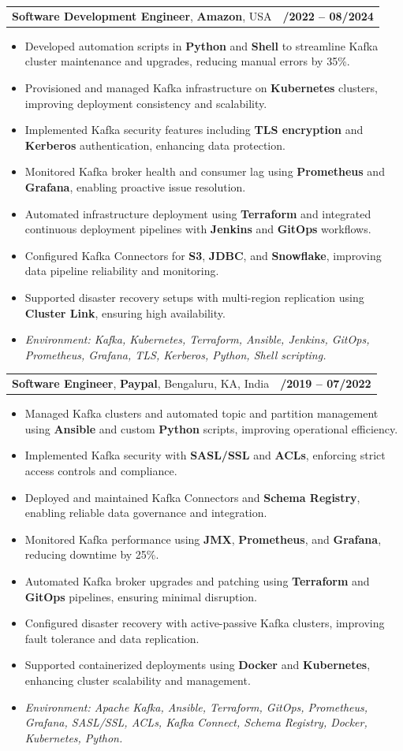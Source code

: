 \documentclass[letterpaper,11pt]{article}
\makeatletter
\newcommand{\resumeItem}[1]{
  \item\footnotesize{
    {#1 \vspace{-2pt}}
  }
}
\newcommand{\resumeSubheading}[4]{
  \vspace{-2pt}\item
    \begin{tabular*}{1.0\textwidth}[t]{l@{\extracolsep{\fill}}r}
      \textbf{\fontsize{10pt}{14pt}\selectfont #3}, \textbf{\fontsize{10pt}{14pt}\selectfont #1}, \fontsize{10pt}{14pt}\selectfont #4 & \textbf{\fontsize{10pt}{14pt}\selectfont #2} \\
    \end{tabular*}\vspace{-7pt}
}
\newcommand{\resumeItemListStart}{\begin{itemize}[leftmargin=*]}
\newcommand{\resumeItemListEnd}{\end{itemize}\vspace{-5pt}}
\makeatother
\begin{document}
\resumeSubheading
{Amazon}{10/2022 -- 08/2024}
{Software Development Engineer}{USA}
\resumeItemListStart
  \resumeItem{Developed automation scripts in \textbf{Python} and \textbf{Shell} to streamline Kafka cluster maintenance and upgrades, reducing manual errors by 35\%.}
  \resumeItem{Provisioned and managed Kafka infrastructure on \textbf{Kubernetes} clusters, improving deployment consistency and scalability.}
  \resumeItem{Implemented Kafka security features including \textbf{TLS encryption} and \textbf{Kerberos} authentication, enhancing data protection.}
  \resumeItem{Monitored Kafka broker health and consumer lag using \textbf{Prometheus} and \textbf{Grafana}, enabling proactive issue resolution.}
  \resumeItem{Automated infrastructure deployment using \textbf{Terraform} and integrated continuous deployment pipelines with \textbf{Jenkins} and \textbf{GitOps} workflows.}
  \resumeItem{Configured Kafka Connectors for \textbf{S3}, \textbf{JDBC}, and \textbf{Snowflake}, improving data pipeline reliability and monitoring.}
  \resumeItem{Supported disaster recovery setups with multi-region replication using \textbf{Cluster Link}, ensuring high availability.}
  \resumeItem{\textit{Environment: Kafka, Kubernetes, Terraform, Ansible, Jenkins, GitOps, Prometheus, Grafana, TLS, Kerberos, Python, Shell scripting.}}
\resumeItemListEnd

\resumeSubheading
{Paypal}{08/2019 -- 07/2022}
{Software Engineer}{Bengaluru, KA, India}
\resumeItemListStart
  \resumeItem{Managed Kafka clusters and automated topic and partition management using \textbf{Ansible} and custom \textbf{Python} scripts, improving operational efficiency.}
  \resumeItem{Implemented Kafka security with \textbf{SASL/SSL} and \textbf{ACLs}, enforcing strict access controls and compliance.}
  \resumeItem{Deployed and maintained Kafka Connectors and \textbf{Schema Registry}, enabling reliable data governance and integration.}
  \resumeItem{Monitored Kafka performance using \textbf{JMX}, \textbf{Prometheus}, and \textbf{Grafana}, reducing downtime by 25\%.}
  \resumeItem{Automated Kafka broker upgrades and patching using \textbf{Terraform} and \textbf{GitOps} pipelines, ensuring minimal disruption.}
  \resumeItem{Configured disaster recovery with active-passive Kafka clusters, improving fault tolerance and data replication.}
  \resumeItem{Supported containerized deployments using \textbf{Docker} and \textbf{Kubernetes}, enhancing cluster scalability and management.}
  \resumeItem{\textit{Environment: Apache Kafka, Ansible, Terraform, GitOps, Prometheus, Grafana, SASL/SSL, ACLs, Kafka Connect, Schema Registry, Docker, Kubernetes, Python.}}
\resumeItemListEnd
\end{document}
